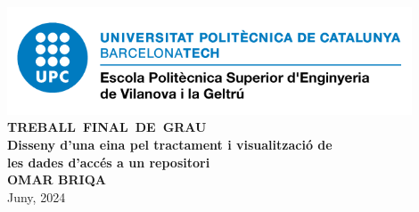 \begin{titlepage}
    \begin{center}

        \vspace*{-3cm}
        \includegraphics[width=0.9\textwidth]{figures/epsevg-logo} \\ [1cm]

        \Huge
        \textbf{\mbox{TREBALL FINAL DE GRAU}} \\ [3cm]

        \Huge
        \textbf{Disseny d'una eina pel tractament i visualització de \\ les dades d'accés a un repositori} \\ [2cm]

        \huge
        \textbf{OMAR BRIQA} \\ [3cm]
        Juny, 2024

    \end{center}
\end{titlepage}
